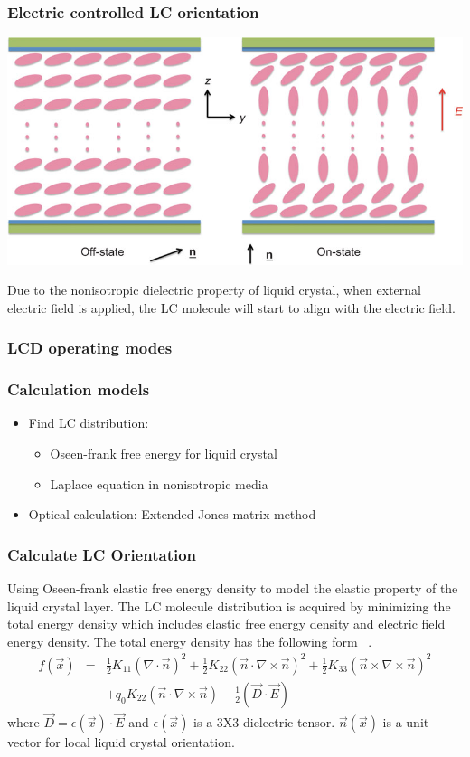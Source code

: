 \documentclass{beamer}
\begin{document}
\begin{frame}
\frametitle{Electric controlled LC orientation}
\begin{center}
\includegraphics[scale=0.4]{ECB.jpg}
\end{center}
Due to the nonisotropic dielectric property of liquid crystal, when external electric field is applied, the LC molecule will start to align with the electric field.
\end{frame}
\begin{frame}
\frametitle{LCD operating modes}

\end{frame}
\begin{frame}
\frametitle{Calculation models}
\begin{itemize}
\item<1-> Find LC distribution:
\begin{itemize}
\item<1-> Oseen-frank free energy for liquid crystal
\item<1-> Laplace equation in nonisotropic media
\end{itemize}
\item<1-> Optical calculation: Extended Jones matrix method
\end{itemize}
\end{frame}
\begin{frame}
\frametitle{Calculate LC Orientation}
Using Oseen-frank elastic free energy density to model the elastic property of the liquid crystal layer.
The LC molecule distribution is acquired by minimizing the total energy density which includes elastic free energy density and electric field energy density.
The total energy density has the following form ~\cite{ShinTson}.
\begin{eqnarray}
f(\vec x) &=& \frac{1}{2}K_{11}(\nabla\cdot\vec n)^2+\frac{1}{2}K_{22}(\vec n\cdot\nabla\times\vec n)^2 + \frac{1}{2}K_{33}(\vec n\times\nabla\times\vec n)^2\nonumber \\
&&+q_0K_{22}(\vec n\cdot\nabla\times\vec n) - \frac{1}{2}(\vec D\cdot\vec E)\nonumber
\label{eq:free_energy}
\end{eqnarray}
where $\vec D = \epsilon(\vec x)\cdot \vec E$ and $\epsilon(\vec x)$ is a 3X3 dielectric tensor. $\vec n(\vec{x})$ is a unit vector for local liquid crystal orientation.
\end{frame}
\end{document}
